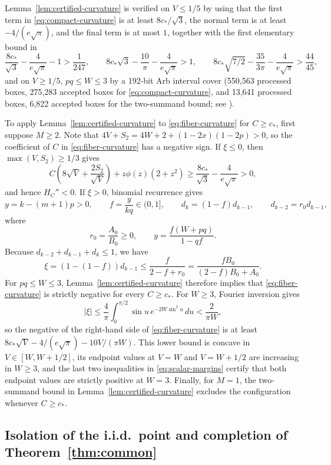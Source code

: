 Lemma~\ref{lem:certified-curvature} is verified on $V\le1/5$ by using that
the first term in \eqref{eq:compact-curvature} is at least $8c_*/\sqrt3$, the
normal term is at least $-4/(e\sqrt\pi)$, and the final term is at most $1$,
together with the first elementary bound in
\begin{equation}\label{eq:scalar-margins}
 \frac{8c_*}{\sqrt3}-\frac4{e\sqrt\pi}-1>\frac1{247},\qquad
 8c_*\sqrt3-\frac{10}{\pi}-\frac4{e\sqrt\pi}>1,\qquad
 8c_*\sqrt{7/2}-\frac{35}{3\pi}-\frac4{e\sqrt\pi}>\frac{44}{45},
\end{equation}
and on $V\ge1/5$, $pq\le W\le3$ by a 192-bit Arb interval cover (550,563
processed boxes, 275,283 accepted boxes for \eqref{eq:compact-curvature}, and
13,641 processed boxes, 6,822 accepted boxes for the two-summand bound; see
).

To apply Lemma~\ref{lem:certified-curvature} to \eqref{eq:fiber-curvature} for
$C\ge c_*$, first suppose $M\ge2$. Note that
$4V+S_2=4W+2+(1-2x)(1-2p)>0$, so the coefficient of $C$ in
\eqref{eq:fiber-curvature} has a negative sign. If $\xi\le0$, then
$\max(V,S_2)\ge1/3$ gives
\[
 C\left(8\sqrt V+\frac{2S_2}{\sqrt V}\right)+z\phi(z)(2+z^2)
 \ge\frac{8c_*}{\sqrt3}-\frac4{e\sqrt\pi}>0,
\]
and hence $H_C''<0$. If $\xi>0$, binomial recurrence gives
\[
 y=k-(m+1)p>0,\qquad f=\frac{y}{kq}\in(0,1],\qquad
 d_k=(1-f)d_{k-1},\qquad d_{k-2}=r_0d_{k-1},
\]
where
\[
 r_0=\frac{A_0}{B_0}\ge0,\qquad y=\frac{f(W+pq)}{1-qf}.
\]
Because $d_{k-2}+d_{k-1}+d_k\le1$, we have
\[
 \xi=(1-(1-f))d_{k-1}\le\frac{f}{2-f+r_0}=\frac{fB_0}{(2-f)B_0+A_0}.
\]
For $pq\le W\le3$, Lemma~\ref{lem:certified-curvature} therefore implies that
\eqref{eq:fiber-curvature} is strictly negative for every $C\ge c_*$. For
$W\ge3$, Fourier inversion gives
\[
 |\xi|\le\frac4\pi\int_0^{\pi/2}\sin u\,e^{-2W\sin^2u}\,du<\frac2{\pi W},
\]
so the negative of the right-hand side of \eqref{eq:fiber-curvature} is at
least $8c_*\sqrt V-4/(e\sqrt\pi)-10V/(\pi W)$. This lower bound is concave in
$V\in[W,W+1/2]$, its endpoint values at $V=W$ and $V=W+1/2$ are increasing in
$W\ge3$, and the last two inequalities in \eqref{eq:scalar-margins} certify
that both endpoint values are strictly positive at $W=3$. Finally, for $M=1$,
the two-summand bound in Lemma~\ref{lem:certified-curvature} excludes the
configuration whenever $C\ge c_*$.

\subsection{Isolation of the i.i.d.\ point and completion of Theorem~\ref{thm:common}}

